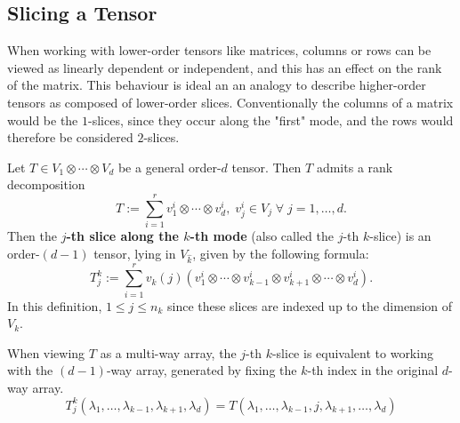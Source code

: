 \documentclass[../Lael_John_MasterThesis_Draft.tex]{subfiles}
\begin{document}
\subsection{Slicing a Tensor}\label{subsection:tensorslicing}
When working with lower-order tensors like matrices, columns or rows can be viewed as linearly dependent or independent, and this has an effect on the rank of the matrix. This behaviour is ideal an an analogy to describe higher-order tensors as composed of lower-order slices. Conventionally the columns of a matrix would be the $1$-slices, since they occur along the "first" mode, and the rows would therefore be considered $2$-slices.
\begin{definition}\label{defn:tensorslicing}
    
    Let $T \in V_1 \otimes \cdots \otimes V_d$ be a general order-$d$ tensor. Then $T$ admits a rank decomposition $$T := \sum_{i=1}^{r} v_1^i \otimes \cdots \otimes v_d^i, \; v_j^i \in V_j \;\forall\; j = 1, \ldots, d.$$Then the \textbf{$j$-th slice along the $k$-th mode} (also called the $j$-th $k$-slice) is an order-$(d-1)$ tensor, lying in $V_{\hat{k}}$, given by the following formula: $$T_j^k := \sum_{i=1}^{r}v_k(j) (v_1^i \otimes \cdots \otimes v_{k-1}^i \otimes v_{k+1}^i \otimes \cdots \otimes v_d^i).$$In this definition, $1 \leq j \leq n_k$ since these slices are indexed up to the dimension of $V_k$.
    
    When viewing $T$ as a multi-way array, the $j$-th $k$-slice is equivalent to working with the $(d-1)$-way array, generated by fixing the $k$-th index in the original $d$-way array. $$T_j^k(\lambda_1, \ldots, \lambda_{k-1},\lambda_{k+1},\lambda_d) = T(\lambda_1, \ldots, \lambda_{k-1}, j, \lambda_{k+1}, \ldots, \lambda_d)$$
\end{definition}
\end{document}
